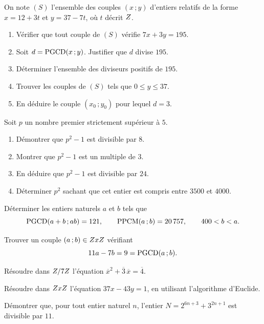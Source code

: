 \begin{annales}
On note $(S)$ l'ensemble des couples $(x\,;y)$ d'entiers relatifs de la forme
$x = 12+3t$ et $y = 37-7t$, où $t$ décrit $Z$.
\begin{enumerate}[label=\textbf{\arabic*)}, leftmargin=*, itemsep=0.15em]
  \item Vérifier que tout couple de $(S)$ vérifie $7x+3y = 195$.
  \item Soit $d = \operatorname{PGCD}(x\,;y)$. Justifier que $d$ divise $195$.
  \item Déterminer l'ensemble des diviseurs positifs de $195$.
  \item Trouver les couples de $(S)$ tels que $0 \leq y \leq 37$.
  \item En déduire le couple $(x_{0}\,;y_{0})$ pour lequel $d = 3$.
\end{enumerate}

Soit $p$ un nombre premier strictement supérieur à $5$.
\begin{enumerate}[label=\textbf{\alph*)}, leftmargin=*, itemsep=0.15em]
  \item Démontrer que $p^{2}-1$ est divisible par $8$.
  \item Montrer que $p^{2}-1$ est un multiple de $3$.
  \item En déduire que $p^{2}-1$ est divisible par $24$.
  \item Déterminer $p^{2}$ sachant que cet entier est compris entre $3500$ et
        $4000$.
\end{enumerate}

Déterminer les entiers naturels $a$ et $b$ tels que
\[
  \operatorname{PGCD}(a+b\,;ab) = 121, \qquad \operatorname{PPCM}(a\,;b) = 20\,757, \qquad 400 < b < a .
\]

Trouver un couple $(a\,;b) \in ZxZ$ vérifiant
\[
  11a-7b = 9 = \operatorname{PGCD}(a\,;b).
\]

Résoudre dans $Z/7Z$ l'équation
$\overline x^{2}+\overline3\,\overline x = \overline4$.

Résoudre dans $ZxZ$ l'équation $37x-43y = 1$, en utilisant l'algorithme
d'Euclide.

Démontrer que, pour tout entier naturel $n$, l'entier
$N = 2^{6n+3}+3^{2n+1}$ est divisible par $11$.
\end{annales}

